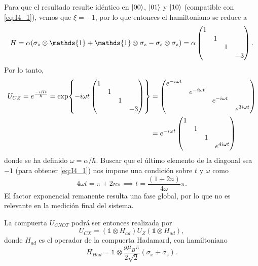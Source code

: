 \documentclass{scrartcl}
\DeclareRobustCommand{\[}{\begin{equation}}
\DeclareRobustCommand{\]}{\end{equation}}
\begin{document}
\begin{enumerate}
\[    \]
    Para que el resultado resulte idéntico en $\ket{00}$, $\ket{01}$ y $\ket{10}$ (compatible con \eqref{eq:I4_1}), vemos que $\xi = -1$, por lo que entonces el hamiltoniano se reduce a
    \[ H = \alpha (\sigma_z \otimes \mathds{1} + \mathds{1} \otimes \sigma_z - \sigma_z \otimes \sigma_z ) = \alpha \begin{pmatrix} \mqty{\dmat{1, 1, 1, -3}} \end{pmatrix}. \]
    Por lo tanto,
    \begin{align}
        U_{CZ} = e^{\frac{-iHt}{\hbar}} = \exp{-i\omega t \begin{pmatrix} \mqty{\dmat{1, 1, 1, -3}} \end{pmatrix}} &=
        \begin{pmatrix}
            \mqty{\dmat{e^{-i\omega t}, e^{-i\omega t}, e^{-i\omega t}, e^{3i\omega t}}}
        \end{pmatrix} \\
        &= e^{-i\omega t}
        \begin{pmatrix}
            \mqty{\dmat{1, 1, 1, e^{4i\omega t}}}
        \end{pmatrix}
    \end{align}
    donde se ha definido $\omega = \alpha / \hbar$. Buscar que el último elemento de la diagonal sea $-1$ (para obtener \eqref{eq:I4_1}) nos impone una condición sobre $t$ y $\omega$ como
    \[ 4\omega t = \pi + 2n\pi \implies t = \frac{(1+2n)}{4\omega} \pi. \]
    El factor exponencial remanente resulta una fase global, por lo que no es relevante en la medición final del sistema.
    
    La compuerta $U_{CNOT}$ podrá ser entonces realizada por
    \[ U_{CX} = (\mathds{1} \otimes H_{ad} ) U_Z (\mathds{1} \otimes H_{ad}), \]
    donde $H_{ad}$ es el operador de la compuerta Hadamard, con hamiltoniano 
    \[ H_{Had} = \mathds{1} \otimes \frac{g \mu_B \pi}{2 \sqrt{2}} (\sigma_x + \sigma_z). \]
    
\end{enumerate}
\end{document}
